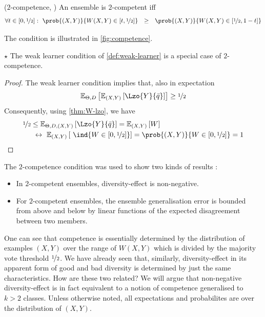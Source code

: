 \documentclass[../main.tex]{subfiles}
\begin{document}
\begin{definition} 
   \label{def:2-competence} 
    ($2$-competence, \cite{theisen_WhenAreEnsembles_2023}) An ensemble is $2$-competent iff
$$
\forall t \in \left[ 0, \nicefrac{1}{2} \right]: ~ \prob{(X,Y) }{W(X,Y)  \in \left[ t, \nicefrac{1}{2} \right]} ~ ~  \geq ~ ~ \prob{(X,Y) }{W(X,Y) \in \left[ \nicefrac{1}{2}, 1-t \right]}
$$
\end{definition}
The condition is illustrated in \cref{fig:competence}.  

\begin{proposition} $\star$
\label{thm:weak-learner-competence}
The weak learner condition of \cref{def:weak-learner} is a special case of $2$-competence.
\end{proposition}
\begin{proof}
The weak learner condition implies that, also in expectation
$$
\mathbb{E}_{\Theta,D}\left[ \mathbb{E}_{(X,Y) }\left[ \Lzo{Y}{\bar{q}} \right]  \right]  \geq \nicefrac{1}{2}
$$
Consequently, using \cref{thm:W-lzo}, we have
\begin{align*}
\nicefrac{1}{2} &\leq \mathbb{E}_{\Theta,D, (X,Y) }\left[ \Lzo{Y}{\bar{q}} \right]  = \mathbb{E}_{(X,Y) }\left[ W \right]  \\
& ~\leftrightarrow~ \mathbb{E}_{(X,Y) }\left[ ~\ind{W \in \left[ 0, \nicefrac{1}{2} \right]}  \right] = \prob{(X,Y) }{W \in [0, \nicefrac{1}{2}]} = 1
\end{align*}
\end{proof}

The $2$-competence condition was used to show two kinds of results \cite{theisen_WhenAreEnsembles_2023}:
\begin{itemize}
	\item In $2$-competent ensembles, diversity-effect is non-negative.
	\item For $2$-competent ensembles, the ensemble generalisation error is bounded from above and below by linear functions of the expected disagreement between two members.
\end{itemize}

One can see that competence is essentially determined by the distribution of examples $(X,Y)$ over the range of $W(X,Y)$ which is divided by the majority vote threshold $\nicefrac{1}{2}$. We have already seen that, similarly, diversity-effect in its apparent form of good and bad diversity is determined by just the same characteristics. How are these two related?
We will argue that non-negative diversity-effect is in fact equivalent to a notion of competence generalised to $k > 2$ classes. Unless otherwise noted, all expectations and probabilites are over the distribution of $(X,Y)$.
\end{document}
